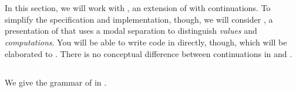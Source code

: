 \documentclass[11pt]{article}
\begin{document}
\section{\LangKPCF{}}

In this section, we will work with \LangKPCF{}, an extension of \LangPCF{} with continuations.
To simplify the specification and implementation, though, we will consider \LangKPCFv{}, a presentation of \LangKPCF{} that uses a modal separation to distinguish \emph{values} and \emph{computations}.
You will be able to write code in \LangKPCF{} directly, though, which will be elaborated to \LangKPCFv{}.
There is no conceptual difference between continuations in \LangKPCFv{} and \LangKPCF{}.

\subsection{\LangKPCF{}}\label{sec:kpcf}

We give the grammar of \LangKPCF{} in .
\end{document}

